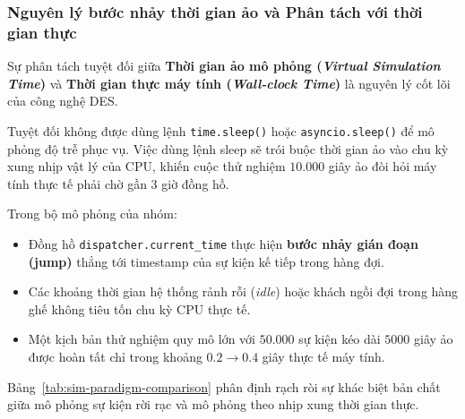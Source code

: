 \subsubsection{Nguyên lý bước nhảy thời gian ảo và Phân tách với thời gian thực}
\label{subsubsec:virtual-clock-jump}

\hspace{0.5cm}Sự phân tách tuyệt đối giữa \textbf{Thời gian ảo mô phỏng (\textit{Virtual Simulation Time})} và \textbf{Thời gian thực máy tính (\textit{Wall-clock Time})} là nguyên lý cốt lõi của công nghệ DES.

\begin{tcolorbox}[colback=red!5!white, colframe=red!75!black, title=\textbf{Cảnh báo sai lầm nghiêm trọng trong mô phỏng DES}]
Tuyệt đối không được dùng lệnh \texttt{time.sleep()} hoặc \texttt{asyncio.sleep()} để mô phỏng độ trễ phục vụ. Việc dùng lệnh sleep sẽ trói buộc thời gian ảo vào chu kỳ xung nhịp vật lý của CPU, khiến cuộc thử nghiệm $10.000$ giây ảo đòi hỏi máy tính thực tế phải chờ gần 3 giờ đồng hồ.
\end{tcolorbox}

Trong bộ mô phỏng của nhóm:
\begin{itemize}[leftmargin=1.5em, itemsep=2pt]
\item Đồng hồ \texttt{dispatcher.current\_time} thực hiện \textbf{bước nhảy gián đoạn (jump)} thẳng tới timestamp của sự kiện kế tiếp trong hàng đợi.
\item Các khoảng thời gian hệ thống rảnh rỗi (\textit{idle}) hoặc khách ngồi đợi trong hàng ghế không tiêu tốn chu kỳ CPU thực tế.
\item Một kịch bản thử nghiệm quy mô lớn với $50.000$ sự kiện kéo dài $5000$ giây ảo được hoàn tất chỉ trong khoảng $0.2 \to 0.4$ giây thực tế máy tính.
\end{itemize}

Bảng~\ref{tab:sim-paradigm-comparison} phân định rạch ròi sự khác biệt bản chất giữa mô phỏng sự kiện rời rạc và mô phỏng theo nhịp xung thời gian thực.

